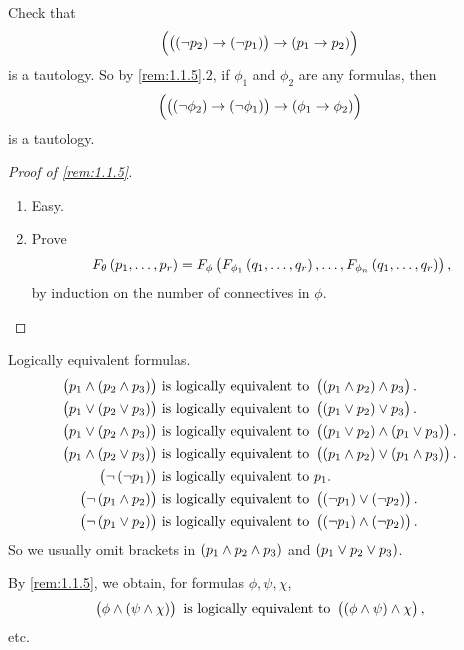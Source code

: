 \pagebreak

\begin{example}
Check that
$$ \impb{\impb{\notb{p_2}}{\notb{p_1}}}{\impb{p_1}{p_2}} $$
is a tautology. So by \ref{rem:1.1.5}.$ 2 $, if $ \phi_1 $ and $ \phi_2 $ are any formulas, then
$$ \impb{\impb{\notb{\phi_2}}{\notb{\phi_1}}}{\impb{\phi_1}{\phi_2}} $$
is a tautology.
\end{example}

\begin{proof}[Proof of \ref{rem:1.1.5}]
\hfill
\begin{enumerate}
\item Easy.
\item Prove
$$ F_\theta\br{p_1, \dots, p_r} = F_\phi\br{F_{\phi_1}\br{q_1, \dots, q_r}, \dots, F_{\phi_n}\br{q_1, \dots, q_r}}, $$
by induction on the number of connectives in $ \phi $.
\end{enumerate}
\end{proof}

\begin{example*}
Logically equivalent formulas.
\begin{align*}
\andb{p_1}{\andb{p_2}{p_3}} \ & \text{is logically equivalent to} \ \andb{\andb{p_1}{p_2}}{p_3}. \\
\orb{p_1}{\orb{p_2}{p_3}} \ & \text{is logically equivalent to} \ \orb{\orb{p_1}{p_2}}{p_3}. \\
\orb{p_1}{\andb{p_2}{p_3}} \ & \text{is logically equivalent to} \ \andb{\orb{p_1}{p_2}}{\orb{p_1}{p_3}}. \\
\andb{p_1}{\orb{p_2}{p_3}} \ & \text{is logically equivalent to} \ \orb{\andb{p_1}{p_2}}{\andb{p_1}{p_3}}. \\
\notb{\notb{p_1}} \ & \text{is logically equivalent to} \ p_1. \\
\notb{\andb{p_1}{p_2}} \ & \text{is logically equivalent to} \ \orb{\notb{p_1}}{\notb{p_2}}. \\
\notb{\orb{p_1}{p_2}} \ & \text{is logically equivalent to} \ \andb{\notb{p_1}}{\notb{p_2}}.
\end{align*}
So we usually omit brackets in $ \br{p_1 \land p_2 \land p_3} $ and $ \br{p_1 \lor p_2 \lor p_3} $.
\end{example*}

\begin{note*}
By \ref{rem:1.1.5}, we obtain, for formulas $ \phi, \psi, \chi $,
$$ \andb{\phi}{\andb{\psi}{\chi}} \ \text{is logically equivalent to} \ \andb{\andb{\phi}{\psi}}{\chi}, $$
etc.
\end{note*}

